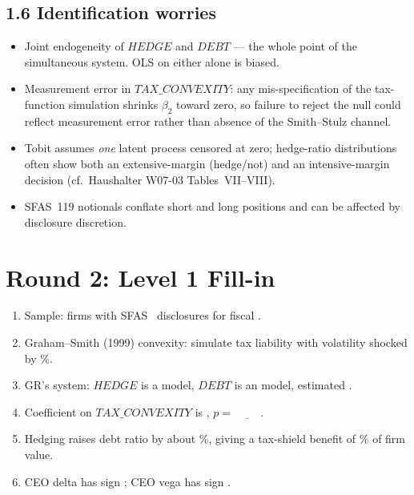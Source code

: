 \documentclass[11pt]{article}
\newcommand{\blank}[1]{\underline{\hspace{#1}}}
\begin{document}
\subsection*{1.6 Identification worries}
\begin{alertbox}
\begin{itemize}
\item Joint endogeneity of $HEDGE$ and $DEBT$ --- the whole point of the simultaneous system. OLS on either alone is biased.
\item Measurement error in $TAX\_CONVEXITY$: any mis-specification of the tax-function simulation shrinks $\beta_2$ toward zero, so failure to reject the null could reflect measurement error rather than absence of the Smith--Stulz channel.
\item Tobit assumes \emph{one} latent process censored at zero; hedge-ratio distributions often show both an extensive-margin (hedge/not) and an intensive-margin decision (cf.\ Haushalter W07-03 Tables~VII--VIII).
\item SFAS~119 notionals conflate short and long positions and can be affected by disclosure discretion.
\end{itemize}
\end{alertbox}

\section*{Round 2: Level 1 Fill-in}
\begin{enumerate}
\item Sample: \blank{1cm} firms with SFAS~\blank{1cm} disclosures for fiscal \blank{1.5cm}.
\item Graham--Smith (1999) convexity: simulate tax liability with volatility shocked by \blank{0.8cm}\%.
\item GR's system: $HEDGE$ is a \blank{1cm} model, $DEBT$ is an \blank{1cm} model, estimated \blank{2cm}.
\item Coefficient on $TAX\_CONVEXITY$ is \blank{1cm}, $p=\blank{1cm}$.
\item Hedging raises debt ratio by about \blank{1cm}\%, giving a tax-shield benefit of \blank{1cm}\% of firm value.
\item CEO delta has sign \blank{0.8cm}; CEO vega has sign \blank{0.8cm}.
\end{enumerate}
\end{document}
